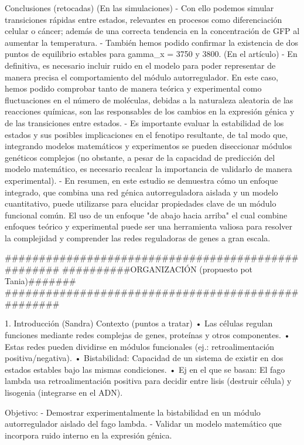 Conclusiones (retocadas)
	(En las simulaciones)
	- Con ello podemos simular transiciones rápidas entre estados, relevantes en procesos como diferenciación celular o cáncer; además de una correcta tendencia en la concentración de GFP al aumentar la temperatura.
	- También hemos podido confirmar la existencia de dos puntos de equilibrio estables para gamma_x = 3750 y 3800.
	(En el artículo)
	- En definitiva, es necesario incluir ruido en el modelo para poder representar de manera precisa el comportamiento del módulo autorregulador. En este caso, hemos podido comprobar tanto de manera teórica y experimental como fluctuaciones en el número de moléculas, debidas a la naturaleza aleatoria de las reacciones químicas, son las responsables de los cambios en la expresión génica y de las transiciones entre estados. 
	- Es importante evaluar la estabilidad de los estados y sus posibles implicaciones en el fenotipo resultante, de tal modo que, integrando modelos matemáticos y experimentos se pueden diseccionar módulos genéticos complejos (no obstante, a pesar de la capacidad de predicción del modelo matemático, es necesario recalcar la importancia de validarlo de manera experimental).
	- En resumen, en este estudio se demuestra cómo un enfoque integrado, que combina una red génica autorreguladora aislada y un modelo cuantitativo, puede utilizarse para elucidar propiedades clave de un módulo funcional común. El uso de un enfoque "de abajo hacia arriba" el cual combine enfoques teórico y experimental puede ser una herramienta valiosa para resolver la complejidad y comprender las redes reguladoras de genes a gran escala.



###################################################
##########ORGANIZACIÓN (propuesto pot Tania)#######
###################################################

1. Introducción (Sandra)
Contexto (puntos a tratar)
•	Las células regulan funciones mediante redes complejas de genes, proteínas y otros componentes.
•	Estas redes pueden dividirse en módulos funcionales (ej.: retroalimentación positiva/negativa).
•	Bistabilidad: Capacidad de un sistema de existir en dos estados estables bajo las mismas condiciones.
•	Ej en el que se basan: El fago lambda usa retroalimentación positiva para decidir entre lisis (destruir célula) y lisogenia (integrarse en el ADN).

Objetivo:
- Demostrar experimentalmente la bistabilidad en un módulo autorregulador aislado del fago lambda.
- Validar un modelo matemático que incorpora ruido interno en la expresión génica.


